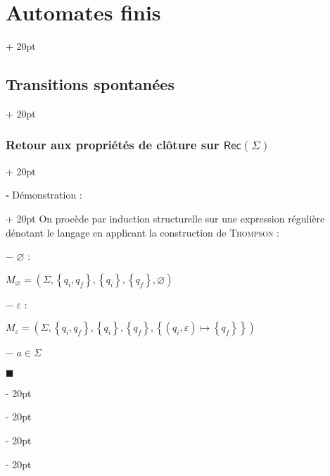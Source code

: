 \documentclass[a4paper, 12pt, twoside]{article}
\newcommand{\lr}[1]{\left( #1 \right)}
\newcommand{\set}[1]{\left\{ #1 \right\}}
\newcommand{\ind}[1][20pt]{\advance\leftskip + #1}
\newcommand{\deind}[1][20pt]{\advance\leftskip - #1}
\newenvironment{indt}[2][20pt]{#2 \par \ind[#1]}{\par \deind} %
\newenvironment{proof}[1][{Démonstration :}]{\begin{indt}{$\square$ #1}}{$\blacksquare$ \end{indt}}
\newcommand{\Rec}[1]{\mathsf{Rec}\!\lr{#1}}
\begin{document}
\begin{indt}{\section{Automates finis}}
\begin{indt}{\subsection{Transitions spontanées}}
\begin{indt}{\subsubsection{Retour aux propriétés de clôture sur $\Rec \Sigma$}}
                \vspace{12pt}
                
                \begin{proof}
                    On procède par induction structurelle sur une expression régulière dénotant le langage en applicant la construction de \textsc{Thompson} :

                    $-$ $\varnothing$ :
                    \begin{center}
                    \end{center}

                    $M_\varnothing = (\Sigma, \set{q_i, q_f}, \set{q_i}, \set{q_f}, \varnothing)$

                    \newpage
                    
                    $-$ $\varepsilon$ :
                    \begin{center}
                    \end{center}

                    $
                        M_\varepsilon = \lr{
                            \Sigma,
                            \set{q_i, q_f},
                            \set{q_i},
                            \set{q_f},
                            \set{(q_i, \varepsilon) \longmapsto \set{q_f}}
                        }
                    $

                    \vspace{6pt}
                    
                    $-$ $a \in \Sigma$
                    \begin{center}
\end{center}
\end{proof}
\end{indt}
\end{indt}
\end{indt}
\end{document}
